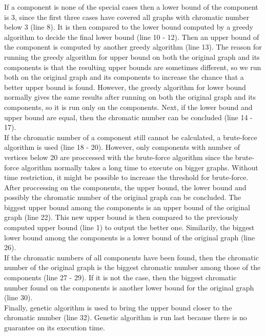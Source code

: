\documentclass[a4paper]{report}
\begin{document}
	If a component is none of the special cases then a lower bound of the component is 3, since the first three cases have covered all graphs with chromatic number below 3 (line 8). It is then compared to the lower bound computed by a greedy algorithm to decide the final lower bound (line 10 - 12). Then an upper bound of the component is computed by another greedy algorithm (line 13). The reason for running the greedy algorithm for upper bound on both the original graph and its components is that the resulting upper bounds are sometimes different, so we run both on the original graph and its components to increase the chance that a better upper bound is found. However, the greedy algorithm for lower bound normally gives the same results after running on both the original graph and its components, so it is run only on the components. Next, if the lower bound and upper bound are equal, then the chromatic number can be concluded (line 14 - 17). \\
	
	If the chromatic number of a component still cannot be calculated, a brute-force algorithm is used (line 18 - 20). However, only components with number of vertices below 20 are proccessed with the brute-force algorithm since the brute-force algorithm normally takes a long time to execute on bigger graphs. Without time restriction, it might be possible to increase the threshold for brute-force.\\
	
	After proccessing on the components, the upper bound, the lower bound and possibly the chromatic number of the original graph can be concluded. The biggest upper bound among the components is an upper bound of the original graph (line 22). This new upper bound is then compared to the previously computed upper bound (line 1) to output the better one. Similarily, the biggest lower bound among the components is a lower bound of the original graph (line 26). \\
	
	If the chromatic numbers of all components have been found, then the chromatic number of the original graph is the biggest chromatic number among those of the components (line 27 - 29). If it is not the case, then the biggest chromatic number found on the components is another lower bound for the original graph (line 30).\\
	
	Finally, genetic algorithm is used to bring the upper bound closer to the chromatic number (line 32). Genetic algorithm is run last because there is no guarantee on its execution time.\\
	
\end{document}

